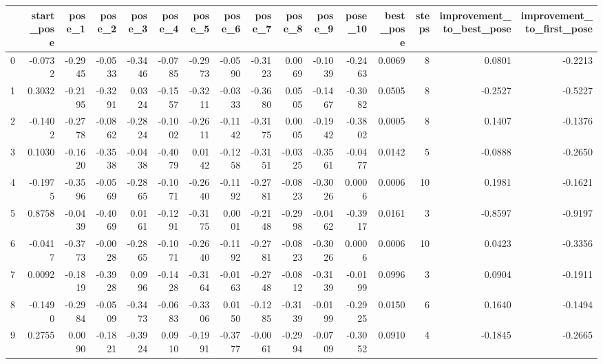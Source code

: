 \begin{tabular}{lrrrrrrrrrrrrrrr}
\toprule
{} &  start\_pose &  pose\_1 &  pose\_2 &  pose\_3 &  pose\_4 &  pose\_5 &  pose\_6 &  pose\_7 &  pose\_8 &  pose\_9 &  pose\_10 &  best\_pose &  steps &  improvement\_to\_best\_pose &  improvement\_to\_first\_pose \\
\midrule
0  &     -0.0732 & -0.2945 & -0.0533 & -0.3446 & -0.0785 & -0.2973 & -0.0590 & -0.3123 &  0.0069 & -0.1039 &  -0.2463 &     0.0069 &      8 &                    0.0801 &                    -0.2213 \\
1  &      0.3032 & -0.2195 & -0.3291 &  0.0324 & -0.1557 & -0.3211 & -0.0333 & -0.3680 &  0.0505 & -0.1467 &  -0.3082 &     0.0505 &      8 &                   -0.2527 &                    -0.5227 \\
2  &     -0.1402 & -0.2778 & -0.0862 & -0.2824 & -0.1002 & -0.2611 & -0.1142 & -0.3175 &  0.0005 & -0.1942 &  -0.3802 &     0.0005 &      8 &                    0.1407 &                    -0.1376 \\
3  &      0.1030 & -0.1620 & -0.3538 & -0.0438 & -0.4079 &  0.0142 & -0.1258 & -0.3151 & -0.0325 & -0.3561 &  -0.0477 &     0.0142 &      5 &                   -0.0888 &                    -0.2650 \\
4  &     -0.1975 & -0.3596 & -0.0569 & -0.2865 & -0.1071 & -0.2640 & -0.1192 & -0.2781 & -0.0823 & -0.3026 &   0.0006 &     0.0006 &     10 &                    0.1981 &                    -0.1621 \\
5  &      0.8758 & -0.0439 & -0.4069 &  0.0161 & -0.1291 & -0.3175 &  0.0001 & -0.2148 & -0.2998 & -0.0462 &  -0.3917 &     0.0161 &      3 &                   -0.8597 &                    -0.9197 \\
6  &     -0.0417 & -0.3773 & -0.0028 & -0.2865 & -0.1071 & -0.2640 & -0.1192 & -0.2781 & -0.0823 & -0.3026 &   0.0006 &     0.0006 &     10 &                    0.0423 &                    -0.3356 \\
7  &      0.0092 & -0.1819 & -0.3928 &  0.0996 & -0.1428 & -0.3164 & -0.0163 & -0.2748 & -0.0812 & -0.3139 &  -0.0199 &     0.0996 &      3 &                    0.0904 &                    -0.1911 \\
8  &     -0.1490 & -0.2984 & -0.0509 & -0.3473 & -0.0683 & -0.3306 &  0.0150 & -0.1285 & -0.3139 & -0.0199 &  -0.2925 &     0.0150 &      6 &                    0.1640 &                    -0.1494 \\
9  &      0.2755 &  0.0090 & -0.1821 & -0.3924 &  0.0910 & -0.1991 & -0.3777 & -0.0061 & -0.2994 & -0.0709 &  -0.3052 &     0.0910 &      4 &                   -0.1845 &                    -0.2665 \\

\end{tabular}
